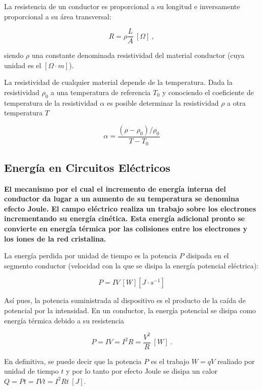 \documentclass{tufte-handout}
\begin{document}
La resistencia de un conductor es proporcional a su longitud e inversamente proporcional a su área transversal:

\begin{equation}
R = \rho\frac{L}{A}~[\Omega]~,
\end{equation}

siendo $\rho$ una constante denominada resistividad del material conductor (cuya unidad es el $[\Omega\cdot m]$).

La resistividad de cualquier material depende de la temperatura. Dada la resistividad $\rho_0$ a una temperatura de referencia $T_0$ y conociendo el coeficiente de temperatura de la resistividad $\alpha$ es posible determinar la resistividad $\rho$ a otra temperatura $T$

\begin{equation}
\alpha = \frac{(\rho - \rho_0)/\rho_0}{T - T_0}
\end{equation}

\subsection{Energía en Circuitos Eléctricos}

\textbf{El mecanismo por el cual el incremento de energía interna del conductor da lugar a un aumento de su temperatura se denomina efecto Joule. El campo eléctrico realiza un trabajo sobre los electrones incrementando su energía cinética. Esta energía adicional pronto se convierte en energía térmica por las colisiones entre los electrones y los iones de la red cristalina.}

La energía perdida por unidad de tiempo es la potencia $P$ disipada en el segmento conductor (velocidad con la que se disipa la energía potencial eléctrica):

\begin{equation}
P = IV~[W][J\cdot s^{-1}]
\end{equation}

Así pues, la potencia suministrada al dispositivo es el producto de la caída de potencial por la intensidad. En un conductor, la energía potencial se disipa como energía térmica debido a su resistencia

\begin{equation}
P = IV = I^2R = \frac{V^2}{R}~[W]~.
\end{equation}

En definitiva, se puede decir que la potencia $P$ es el trabajo $W = qV$ realiado por unidad de tiempo $t$ y por lo tanto por efecto Joule se disipa un calor $Q = Pt = IVt = I^2Rt~[J]$.
\end{document}
